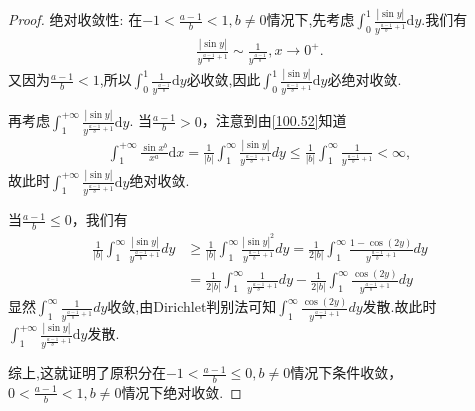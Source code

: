 \documentclass[../../main.tex]{subfiles}
\begin{document}
\begin{proof}
{\heiti 绝对收敛性:} 在\(-1 < \frac{a - 1}{b} < 1, b\neq 0\)情况下,先考虑$\int_0^1{\frac{\left| \sin y \right|}{y^{\frac{a-1}{b}+1}}\mathrm{d}y}$.我们有
\begin{align*}
\frac{\left| \sin y \right|}{y^{\frac{a-1}{b}+1}}\sim \frac{1}{y^{\frac{a-1}{b}}},x\rightarrow 0^+.
\end{align*}
又因为$\frac{a-1}{b}<1$,所以$\int_0^1{\frac{1}{y^{\frac{a-1}{b}}}\mathrm{d}y}$必收敛,因此$\int_0^1{\frac{\left| \sin y \right|}{y^{\frac{a-1}{b}+1}}\mathrm{d}y}$必绝对收敛.

再考虑$\int_{1}^{+\infty}{\frac{\left| \sin y \right|}{y^{\frac{a-1}{b}+1}}\mathrm{d}y}$.
当\(\frac{a - 1}{b}>0\)，注意到由\eqref{100.52}知道
\begin{align*}
\int_{1}^{+\infty}\frac{\sin x^b}{x^a}\mathrm{d}x=\frac{1}{|b|}\int_{1}^{\infty}\frac{|\sin y|}{y^{\frac{a - 1}{b}+1}}dy \leqslant \frac{1}{|b|}\int_{1}^{\infty}\frac{1}{y^{\frac{a - 1}{b}+1}} < \infty,
\end{align*}
故此时$\int_{1}^{+\infty}{\frac{\left| \sin y \right|}{y^{\frac{a-1}{b}+1}}\mathrm{d}y}$绝对收敛.

当\(\frac{a - 1}{b}\leqslant 0\)，我们有
\begin{align*}
\frac{1}{|b|}\int_{1}^{\infty}\frac{|\sin y|}{y^{\frac{a - 1}{b}+1}}dy &\geqslant \frac{1}{|b|}\int_{1}^{\infty}\frac{|\sin y|^2}{y^{\frac{a - 1}{b}+1}}dy = \frac{1}{2|b|}\int_{1}^{\infty}\frac{1 - \cos(2y)}{y^{\frac{a - 1}{b}+1}}dy \\
&= \frac{1}{2|b|}\int_{1}^{\infty}\frac{1}{y^{\frac{a - 1}{b}+1}}dy - \frac{1}{2|b|}\int_{1}^{\infty}\frac{\cos(2y)}{y^{\frac{a - 1}{b}+1}}dy
\end{align*}
显然$\int_{1}^{\infty}\frac{1}{y^{\frac{a - 1}{b}+1}}dy$收敛,由Dirichlet判别法可知$\int_{1}^{\infty}\frac{\cos(2y)}{y^{\frac{a - 1}{b}+1}}dy$发散.故此时$\int_{1}^{+\infty}{\frac{\left| \sin y \right|}{y^{\frac{a-1}{b}+1}}\mathrm{d}y}$发散.

综上,这就证明了原积分在\(-1 < \frac{a - 1}{b} \leqslant 0, b\neq 0\)情况下条件收敛，\(0 < \frac{a - 1}{b} < 1, b\neq 0\)情况下绝对收敛. 
\end{proof}
\end{document}
